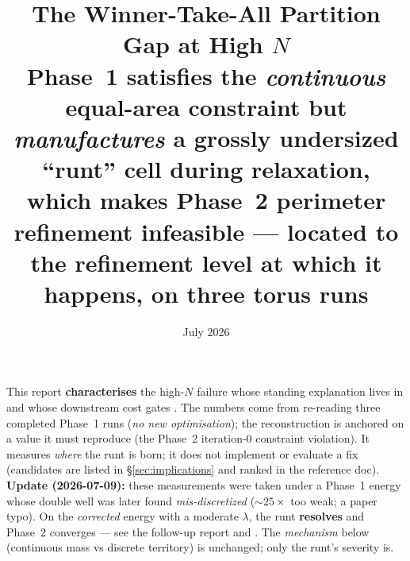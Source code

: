 \documentclass[11pt,a4paper]{article}
\title{\textbf{The Winner-Take-All Partition Gap at High \(N\)}\\[0.5em]
  \large Phase~1 satisfies the \emph{continuous} equal-area constraint but
  \emph{manufactures} a grossly undersized ``runt'' cell during relaxation,
  which makes Phase~2 perimeter refinement infeasible --- located to the
  refinement level at which it happens, on three torus runs}
\author{}
\date{July 2026}
\begin{document}
\maketitle

\begin{tcolorbox}[colback=green!5!white, colframe=green!55!black,
                  title={Status --- measured: the failure is reproduced and its
                  origin located across all five refinement levels of three runs},
                  fontupper=\small]
This report \textbf{characterises} the high-\(N\) failure whose standing
explanation lives in 
and whose downstream cost gates .
The numbers come from re-reading three completed Phase~1 runs (\emph{no new
optimisation}); the reconstruction is anchored on a value it must reproduce (the
Phase~2 iteration-0 constraint violation). It measures \emph{where} the runt is
born; it does not implement or evaluate a fix (candidates are listed in
\S\ref{sec:implications} and ranked in the reference doc).\\[3pt]
\textbf{Update (2026-07-09):} these measurements were taken under a Phase~1 energy
whose double well was later found \emph{mis-discretized} ($\sim\!25\times$ too weak; a
paper typo). On the \emph{corrected} energy with a moderate $\lambda$, the runt
\textbf{resolves} and Phase~2 converges --- see the follow-up report
 and
. The \emph{mechanism}
below (continuous mass vs discrete territory) is unchanged; only the runt's severity is.
\end{tcolorbox}
\end{document}
